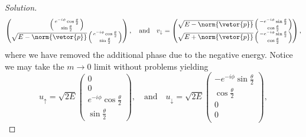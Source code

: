 \begin{proof}[Solution]
\begin{equation*}
\begin{pmatrix}
         \left(\begin{smallmatrix}
             e^{-i\phi} \cos\frac\theta2\\
             \sin\frac\theta2
         \end{smallmatrix}\right)\\
         \sqrt{E - \norm{\vetor{p}}}
         \left(\begin{smallmatrix}
             e^{-i\phi} \cos\frac\theta2\\
             \sin\frac\theta2
         \end{smallmatrix}\right)\\
      \end{pmatrix},
      \quad\text{and}\quad
      v_\downarrow = \begin{pmatrix}
         \sqrt{E - \norm{\vetor{p}}} 
         \left(\begin{smallmatrix}
             -e^{-i\phi} \sin\frac\theta2\\
             \cos\frac\theta2
         \end{smallmatrix}\right)\\
         \sqrt{E + \norm{\vetor{p}}}
         \left(\begin{smallmatrix}
             -e^{-i\phi} \sin\frac\theta2\\
             \cos\frac\theta2
         \end{smallmatrix}\right)\\
      \end{pmatrix},
   \end{equation*}
   where we have removed the additional phase due to the negative energy. Notice we may take the \(m \to 0\) limit without problems yielding
   \begin{equation*}
      u_{\uparrow} =\sqrt{2E}{\begin{pmatrix}
            0\\
            0\\
            e^{-i\phi} \cos\frac\theta2\\
            \sin\frac\theta2
      \end{pmatrix}},\quad\text{and}\quad
      u_{\downarrow} =\sqrt{2E}{\begin{pmatrix}
            -e^{-i\phi} \sin\frac\theta2\\
            \cos\frac\theta2\\
            0\\
            0\\
      \end{pmatrix}},

\end{equation*}
\end{proof}
